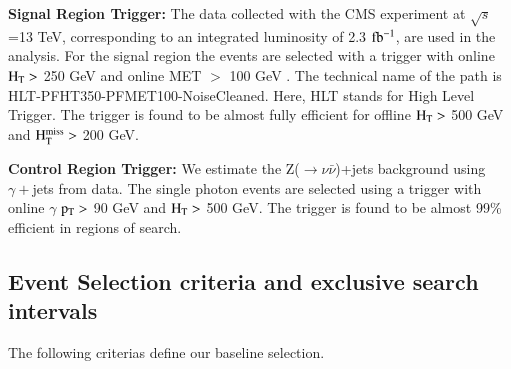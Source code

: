 {\bf Signal Region Trigger:}
The data collected with the CMS experiment at $\sqrt{s}$=13 TeV, corresponding to an integrated luminosity of 2.3 $\rm fb^{-1}$, are used in the analysis. For the signal region the events are selected with a trigger with online $\rm H_{T} >$  250 GeV and online MET $>$ 100 GeV . The technical name of the path is HLT-PFHT350-PFMET100-NoiseCleaned. Here, HLT stands for High Level Trigger. The trigger is found to be almost fully efficient for offline $\rm H_{T} > $ 500 GeV and $\rm H_{T}^{miss} > $ 200 GeV.


{\bf Control Region Trigger: }
We estimate the Z($\rightarrow \nu\bar{\nu}$)+jets background using $\gamma +$jets from data. The single photon events are selected using a trigger with online $\gamma$ $\rm p_{T} > $  90 GeV and $\rm H_{T} > $ 500 GeV. The trigger is found to be almost 99\% efficient in regions of search.  



\subsection{Event Selection criteria and exclusive search intervals}

The following criterias define our baseline selection. 


